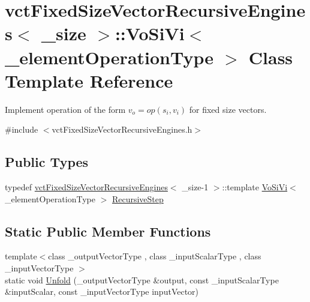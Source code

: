 \hypertarget{classvct_fixed_size_vector_recursive_engines_1_1_vo_si_vi}{}\section{vct\+Fixed\+Size\+Vector\+Recursive\+Engines$<$ \+\_\+size $>$\+:\+:Vo\+Si\+Vi$<$ \+\_\+element\+Operation\+Type $>$ Class Template Reference}
\label{classvct_fixed_size_vector_recursive_engines_1_1_vo_si_vi}


Implement operation of the form $v_o = op(s_i, v_i)$ for fixed size vectors.  




{\ttfamily \#include $<$vct\+Fixed\+Size\+Vector\+Recursive\+Engines.\+h$>$}

\subsection*{Public Types}
\begin{DoxyCompactItemize}
\item 
typedef \hyperlink{classvct_fixed_size_vector_recursive_engines}{vct\+Fixed\+Size\+Vector\+Recursive\+Engines}$<$ \+\_\+size-\/1 $>$\+::template \hyperlink{classvct_fixed_size_vector_recursive_engines_1_1_vo_si_vi}{Vo\+Si\+Vi}$<$ \+\_\+element\+Operation\+Type $>$ \hyperlink{classvct_fixed_size_vector_recursive_engines_1_1_vo_si_vi_a2a5c575fa0857d0d6c13610f43c9302d}{Recursive\+Step}
\end{DoxyCompactItemize}
\subsection*{Static Public Member Functions}
\begin{DoxyCompactItemize}
\item 
{\footnotesize template$<$class \+\_\+output\+Vector\+Type , class \+\_\+input\+Scalar\+Type , class \+\_\+input\+Vector\+Type $>$ }\\static void \hyperlink{classvct_fixed_size_vector_recursive_engines_1_1_vo_si_vi_aecc1ea87eb108820d8778ce739c94df2}{Unfold} (\+\_\+output\+Vector\+Type \&output, const \+\_\+input\+Scalar\+Type \&input\+Scalar, const \+\_\+input\+Vector\+Type input\+Vector)
\end{DoxyCompactItemize}


